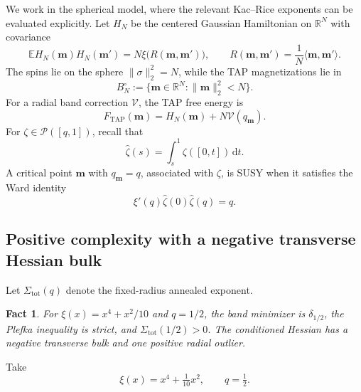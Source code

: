 \documentclass[a4paper,10pt,reqno]{amsart}
\numberwithin{equation}{section}
\newtheorem{fact}[proposition]{Fact}%
\newcommand{\dE}{\mathbb{E}}%
\newcommand{\mc}{\mathcal}
\newcommand{\dd}{\mathrm{d}}
\newcommand{\TAP}{\mathrm{TAP}}
\newcommand{\bfm}{\mathbf{m}}
\newcommand{\zhat}{\widehat\zeta}
\begin{document}
	We work in the spherical model, where the relevant Kac--Rice exponents can be
	evaluated explicitly. Let \(H_N\) be the centered Gaussian Hamiltonian on
	\(\mathbb R^N\) with covariance
	\[
	\dE H_N(\bfm)H_N(\bfm')
	=N\xi\bigl(R(\bfm,\bfm')\bigr),
	\qquad
	R(\bfm,\bfm')=\frac1N\langle\bfm,\bfm'\rangle.
	\]
	The spins lie on the sphere \(\|\sigma\|_2^2=N\), while the TAP
	magnetizations lie in
	\[
	B_N^\circ:=\{\bfm\in\mathbb R^N:\|\bfm\|_2^2<N\}.
	\]
	For a radial band correction \(\mathcal V\), the TAP free energy is
	\[
	F_{\TAP}(\bfm)=H_N(\bfm)+N\mathcal V(q_\bfm).
	\]
	For \(\zeta\in\mc P([q,1])\), recall that
	\[
	\zhat(s)=\int_s^1\zeta([0,t])\,\dd t.
	\]
	A critical point \(\bfm\) with \(q_\bfm=q\), associated with \(\zeta\), is
	SUSY when it satisfies the Ward identity
	\begin{equation}\label{eq:ward1}
		\xi'(q)\zhat(0)\zhat(q)=q.
	\end{equation}
	
	\subsection{Positive complexity with a negative transverse Hessian bulk}
	
	Let \(\Sigma_{\mathrm{tot}}(q)\) denote the fixed-radius annealed exponent.
	
	\begin{fact}
		For \(\xi(x)=x^4+x^2/10\) and \(q=1/2\), the band minimizer is
		\(\delta_{1/2}\), the Plefka inequality is strict, and
		\(\Sigma_{\mathrm{tot}}(1/2)>0\).
		The conditioned Hessian has a negative transverse bulk and one positive
		radial outlier.
	\end{fact}
	
	Take
	\begin{equation}\label{eq:model}
		\xi(x)=x^4+\tfrac1{10}x^2,
		\qquad
		q=\tfrac12.
	\end{equation}
	
\end{document}
